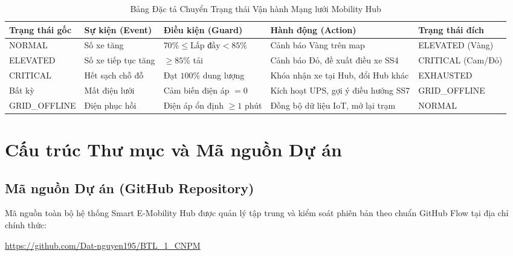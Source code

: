 \documentclass[12pt,a4paper]{article}
\begin{document}
\begin{table}[H]
    \centering
    \small
    \renewcommand{\arraystretch}{1.3}
    \caption{Bảng Đặc tả Chuyển Trạng thái Vận hành Mạng lưới Mobility Hub}
    \label{tab:state-hub-spec}
    \footnotesize
    \begin{tabularx}{\textwidth}{|>{\raggedright\arraybackslash}p{2.4cm}|>{\raggedright\arraybackslash}p{2.2cm}|>{\raggedright\arraybackslash}p{2.6cm}|>{\raggedright\arraybackslash}X|>{\raggedright\arraybackslash}p{2.4cm}|}
        \hline
        \textbf{Trạng thái gốc} & \textbf{Sự kiện (Event)} & \textbf{Điều kiện (Guard)} & \textbf{Hành động (Action)} & \textbf{Trạng thái đích} \\
        \hline
        NORMAL & Số xe tăng & $70\% \le \text{Lấp đầy} < 85\%$ & Cảnh báo Vàng trên map & ELEVATED (Vàng) \\
        ELEVATED & Số xe tiếp tục tăng & $\ge 85\%$ tải & Cảnh báo Đỏ, đề xuất điều xe SS4 & CRITICAL (Cam/Đỏ) \\
        CRITICAL & Hết sạch chỗ đỗ & Đạt $100\%$ dung lượng & Khóa nhận xe tại Hub, đổi Hub khác & EXHAUSTED \\
        Bất kỳ & Mất điện lưới & Cảm biến điện áp $= 0$ & Kích hoạt UPS, gợi ý điều hướng SS7 & GRID\_OFFLINE \\
        GRID\_OFFLINE & Điện phục hồi & Điện áp ổn định $\ge 1$ phút & Đồng bộ dữ liệu IoT, mở lại trạm & NORMAL \\
        \hline
    \end{tabularx}
\end{table}
\newpage

\appendix
\section{Cấu trúc Thư mục và Mã nguồn Dự án}

\subsection{Mã nguồn Dự án (GitHub Repository)}
Mã nguồn toàn bộ hệ thống Smart E-Mobility Hub được quản lý tập trung và kiểm soát phiên bản theo chuẩn GitHub Flow tại địa chỉ chính thức:
\begin{center}
    \url{https://github.com/Dat-nguyen195/BTL_1_CNPM}
\end{center}
\end{document}
